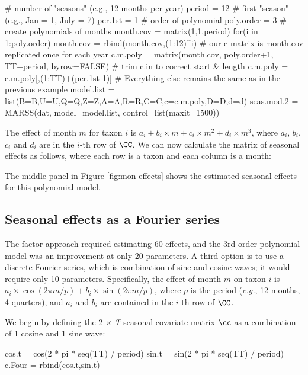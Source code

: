 \begin{Schunk}
\begin{Sinput}
 # number of "seasons" (e.g., 12 months per year)
 period = 12
 # first "season" (e.g., Jan = 1, July = 7)
 per.1st = 1
 # order of polynomial
 poly.order = 3
 # create polynomials of months
 month.cov = matrix(1,1,period)
 for(i in 1:poly.order) {month.cov = rbind(month.cov,(1:12)^i)}
 # our c matrix is month.cov replicated once for each year
 c.m.poly = matrix(month.cov, poly.order+1, TT+period, byrow=FALSE)
 # trim c.in to correct start & length
 c.m.poly = c.m.poly[,(1:TT)+(per.1st-1)]
 # Everything else remains the same as in the previous example
 model.list = list(B=B,U=U,Q=Q,Z=Z,A=A,R=R,C=C,c=c.m.poly,D=D,d=d)
 seas.mod.2 = MARSS(dat, model=model.list, control=list(maxit=1500))
\end{Sinput}
\end{Schunk}
The effect of month $m$ for taxon $i$ is $a_i + b_i \times m + c_i \times m^2 + d_i \times m^3$, where $a_i$, $b_i$, $c_i$ and $d_i$ are in the $i$-th row of $\CC$.  We can now calculate the matrix of seasonal effects as follows, where each row is a taxon and each column is a month:
\begin{Schunk}
\end{Schunk}
The middle panel in Figure \ref{fig:mon-effects} shows the estimated seasonal effects for this polynomial model.

\subsection{Seasonal effects as a Fourier series}

The factor approach required estimating 60 effects, and the 3rd order polynomial model was an improvement at only 20 parameters. A third option is to use a discrete Fourier series, which is combination of sine and cosine waves; it would require only 10 parameters. Specifically, the effect of month $m$ on taxon $i$ is $a_i \times \cos(2 \pi m/p) + b_i \times \sin(2 \pi m/p)$, where $p$ is the period (\emph{e.g.}, 12 months, 4 quarters), and $a_i$ and $b_i$ are contained in the $i$-th row of $\CC$.

We begin by defining the 2 $\times$ \emph{T} seasonal covariate matrix $\cc$ as a combination of 1 cosine and 1 sine wave:
\begin{Schunk}
\begin{Sinput}
 cos.t = cos(2 * pi * seq(TT) / period)
 sin.t = sin(2 * pi * seq(TT) / period)
 c.Four = rbind(cos.t,sin.t)
\end{Sinput}
\end{Schunk}

